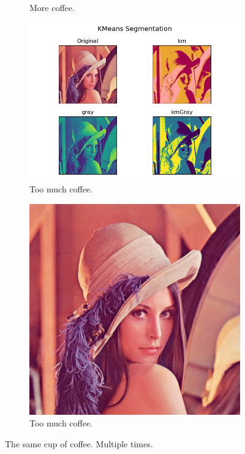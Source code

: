 \documentclass{article}
\begin{document}
\begin{figure}[htb!]
\begin{subfigure}[b]{0.4\linewidth}
    \caption{More coffee.}
  \end{subfigure}
  \begin{subfigure}[b]{0.4\linewidth}
    \includegraphics[width=\linewidth]{kMeans.png}
    \caption{Too much coffee.}
  \end{subfigure}
  \begin{subfigure}[b]{0.4\linewidth}
    \includegraphics[width=\linewidth]{Lenna.png}
    \caption{Too much coffee.}
  \end{subfigure}
  \caption{The same cup of coffee. Multiple times.}
  \label{fig:coffee3}
\end{figure}
\end{document}
